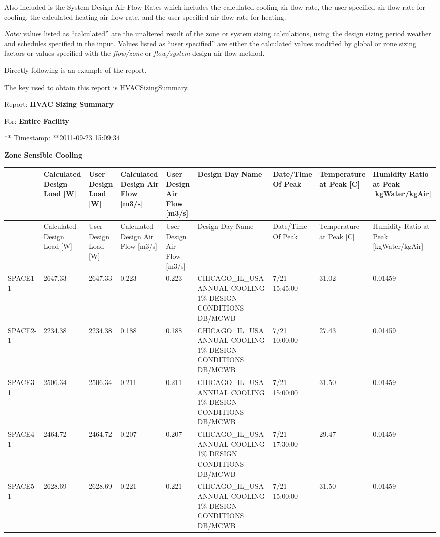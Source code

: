 Also included is the System Design Air Flow Rates which includes the calculated cooling air flow rate, the user specified air flow rate for cooling, the calculated heating air flow rate, and the user specified air flow rate for heating.

\emph{Note:} values listed as ``calculated'' are the unaltered result of the zone or system sizing calculations, using the design sizing period weather and schedules specified in the input. Values listed as ``user specified'' are either the calculated values modified by global or zone sizing factors or values specified with the \emph{flow/zone} or \emph{flow/system} design air flow method.

Directly following is an example of the report.

The key used to obtain this report is HVACSizingSummary.

Report: \textbf{HVAC Sizing Summary}

For: \textbf{Entire Facility}

** Timestamp: **2011-09-23 15:09:34

\textbf{Zone Sensible Cooling}

{\scriptsize
\begin{longtable}[c]{>{\raggedright}p{0.66in}>{\raggedright}p{0.66in}>{\raggedright}p{0.66in}>{\raggedright}p{0.66in}>{\raggedright}p{0.66in}>{\raggedright}p{0.66in}>{\raggedright}p{0.66in}>{\raggedright}p{0.66in}>{\raggedright}p{0.66in}}
\toprule 
 & Calculated Design Load [W] & User Design Load [W] & Calculated Design Air Flow [m3/s] & User Design Air Flow [m3/s] & Design Day Name & Date/Time Of Peak & Temperature at Peak [C] & Humidity Ratio at Peak [kgWater/kgAir] \tabularnewline
\midrule
\endfirsthead

\toprule 
 & Calculated Design Load [W] & User Design Load [W] & Calculated Design Air Flow [m3/s] & User Design Air Flow [m3/s] & Design Day Name & Date/Time Of Peak & Temperature at Peak [C] & Humidity Ratio at Peak [kgWater/kgAir] \tabularnewline
\midrule
\endhead

SPACE1-1 & 2647.33 & 2647.33 & 0.223 & 0.223 & CHICAGO\-\_IL\-\_USA ANNUAL COOLING 1\% DESIGN CONDITIONS DB/MCWB & 7/21 15:45:00 & 31.02 & 0.01459 \tabularnewline
SPACE2-1 & 2234.38 & 2234.38 & 0.188 & 0.188 & CHICAGO\-\_IL\-\_USA ANNUAL COOLING 1\% DESIGN CONDITIONS DB/MCWB & 7/21 10:00:00 & 27.43 & 0.01459 \tabularnewline
SPACE3-1 & 2506.34 & 2506.34 & 0.211 & 0.211 & CHICAGO\-\_IL\-\_USA ANNUAL COOLING 1\% DESIGN CONDITIONS DB/MCWB & 7/21 15:00:00 & 31.50 & 0.01459 \tabularnewline
SPACE4-1 & 2464.72 & 2464.72 & 0.207 & 0.207 & CHICAGO\-\_IL\-\_USA ANNUAL COOLING 1\% DESIGN CONDITIONS DB/MCWB & 7/21 17:30:00 & 29.47 & 0.01459 \tabularnewline
SPACE5-1 & 2628.69 & 2628.69 & 0.221 & 0.221 & CHICAGO\-\_IL\-\_USA ANNUAL COOLING 1\% DESIGN CONDITIONS DB/MCWB & 7/21 15:00:00 & 31.50 & 0.01459 \tabularnewline
\bottomrule
\end{longtable}}

